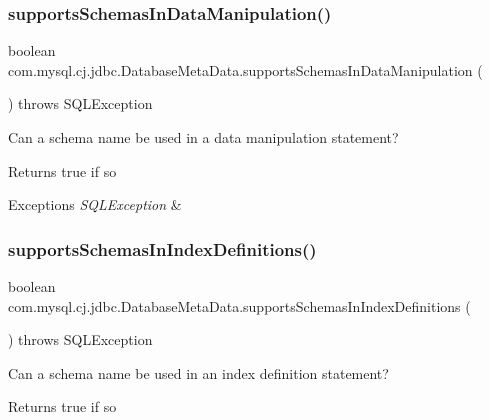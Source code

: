 \subsubsection{\texorpdfstring{supports\+Schemas\+In\+Data\+Manipulation()}{supportsSchemasInDataManipulation()}}
{\footnotesize\ttfamily boolean com.\+mysql.\+cj.\+jdbc.\+Database\+Meta\+Data.\+supports\+Schemas\+In\+Data\+Manipulation (\begin{DoxyParamCaption}{ }\end{DoxyParamCaption}) throws S\+Q\+L\+Exception}

Can a schema name be used in a data manipulation statement?

\begin{DoxyReturn}{Returns}
true if so 
\end{DoxyReturn}

\begin{DoxyExceptions}{Exceptions}
{\em S\+Q\+L\+Exception} & \\
\hline
\end{DoxyExceptions}
\mbox{\label{classcom_1_1mysql_1_1cj_1_1jdbc_1_1_database_meta_data_a1d8b93342e0a95fc227bfa419e2c0b7d}} 
\subsubsection{\texorpdfstring{supports\+Schemas\+In\+Index\+Definitions()}{supportsSchemasInIndexDefinitions()}}
{\footnotesize\ttfamily boolean com.\+mysql.\+cj.\+jdbc.\+Database\+Meta\+Data.\+supports\+Schemas\+In\+Index\+Definitions (\begin{DoxyParamCaption}{ }\end{DoxyParamCaption}) throws S\+Q\+L\+Exception}

Can a schema name be used in an index definition statement?

\begin{DoxyReturn}{Returns}
true if so 
\end{DoxyReturn}

